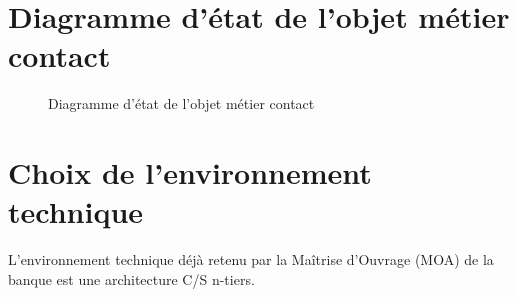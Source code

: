 \section{Diagramme d’état de l'objet métier \bf{contact}}

\begin{figure}[H]
\noindent{}
\caption{Diagramme d'état de l'objet métier contact}
\end{figure}

\section{Choix  de  l’environnement  technique}
L’environnement  technique  déjà  retenu  par  la 
Maîtrise d’Ouvrage (MOA) de la banque est une architecture C/S n-tiers. 